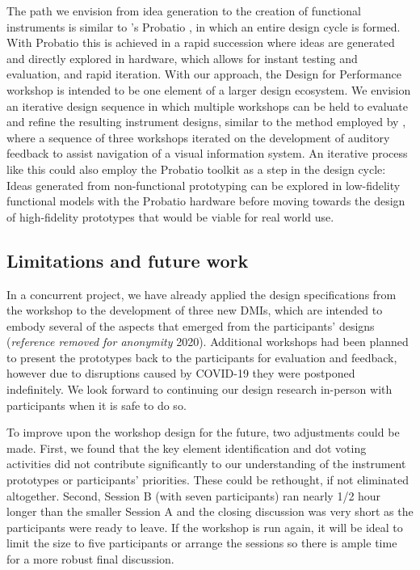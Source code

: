 \documentclass[letterpaper, 12pt]{article}
\begin{document}
The path we envision from idea generation to the creation of functional instruments is similar to \citeauthor{Calegario2017}'s Probatio \citeyearpar{Calegario2017}, in which an entire design cycle is formed. With Probatio this is achieved in a rapid succession where ideas are    generated and directly explored in hardware, which allows for instant testing and evaluation, and rapid iteration. With our approach, the Design for Performance workshop is intended to be one element of a larger design ecosystem. We envision an iterative design sequence in which multiple workshops can be held to evaluate and refine the resulting instrument designs, similar to the method employed by \citet{Absar2015}, where a sequence of three workshops iterated on the development of auditory feedback to assist navigation of a visual information system. An iterative process like this could also employ the Probatio toolkit as a step in the design cycle: Ideas generated from non-functional prototyping can be explored in low-fidelity functional models with the Probatio hardware before moving towards the design of high-fidelity prototypes that would be viable for real world use.

\subsection{Limitations and future work}
\label{sec:limitations-and-future-work}

In a concurrent project, we have already applied the design specifications from the workshop to the development of three new DMIs, which are intended to embody several of the aspects that emerged from the participants' designs
(\emph{reference removed for anonymity} 2020).
Additional workshops had been planned to present the prototypes back to the participants for evaluation and feedback, however due to disruptions caused by COVID-19 they were postponed indefinitely. We look forward to continuing our design research in-person with participants when it is safe to do so.

To improve upon the workshop design for the future, two adjustments could be made. First, we found that the key element identification and dot voting activities did not contribute significantly to our understanding of the instrument prototypes or participants' priorities. These could be rethought, if not eliminated altogether. Second, Session B (with seven participants) ran nearly 1/2 hour longer than the smaller Session A and the closing discussion was very short as the participants were ready to leave. If the workshop is run again, it will be ideal to limit the size to five participants or arrange the sessions so there is ample time for a more robust final discussion. 
\end{document}
